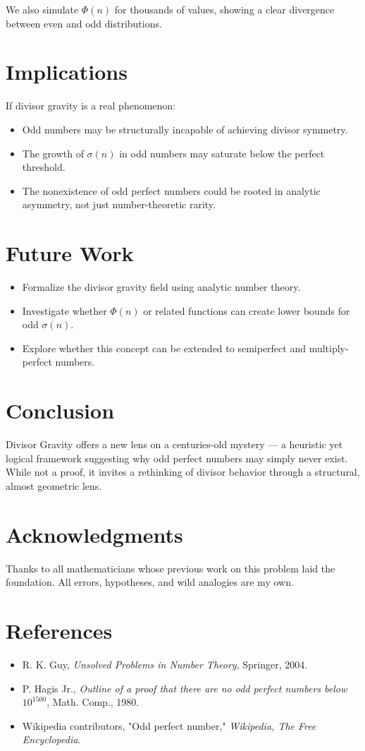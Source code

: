 \documentclass[12pt]{article}
\begin{document}
We also simulate $\Phi(n)$ for thousands of values, showing a clear divergence between even and odd distributions.

\section{Implications}
If divisor gravity is a real phenomenon:
\begin{itemize}
    \item Odd numbers may be structurally incapable of achieving divisor symmetry.
    \item The growth of $\sigma(n)$ in odd numbers may saturate below the perfect threshold.
    \item The nonexistence of odd perfect numbers could be rooted in analytic asymmetry, not just number-theoretic rarity.
\end{itemize}

\section{Future Work}
\begin{itemize}
    \item Formalize the divisor gravity field using analytic number theory.
    \item Investigate whether $\Phi(n)$ or related functions can create lower bounds for odd $\sigma(n)$.
    \item Explore whether this concept can be extended to semiperfect and multiply-perfect numbers.
\end{itemize}

\section{Conclusion}
Divisor Gravity offers a new lens on a centuries-old mystery — a heuristic yet logical framework suggesting why odd perfect numbers may simply never exist. While not a proof, it invites a rethinking of divisor behavior through a structural, almost geometric lens.

\section*{Acknowledgments}
Thanks to all mathematicians whose previous work on this problem laid the foundation. All errors, hypotheses, and wild analogies are my own.

\section*{References}
\begin{itemize}
    \item R. K. Guy, \emph{Unsolved Problems in Number Theory}, Springer, 2004.
    \item P. Hagis Jr., \emph{Outline of a proof that there are no odd perfect numbers below $10^{1500}$}, Math. Comp., 1980.
    \item Wikipedia contributors, "Odd perfect number," \emph{Wikipedia, The Free Encyclopedia}.
\end{itemize}
\end{document}
